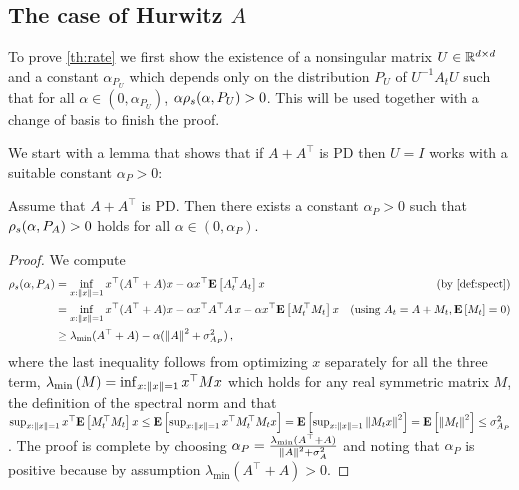 \subsection{The case of Hurwitz $A$}
To prove \cref{th:rate} we first show the existence of a nonsingular matrix $U\in \mathbb{R}^{d\times d}$ and a constant
$\alpha_{P_U}$ which depends only on the distribution $P_U$ of $U^{-1} A_t U$ such that for all $\alpha\in (0,\alpha_{P_U})$, $\alpha \rho_s(\alpha,P_U)>0$. This will be used together with a change of basis to finish the proof.

We start with a lemma that shows that if $A+A^\top$ is PD then $U=I$ works with a suitable constant $\alpha_P>0$:
\begin{lemma}\label{lm:pd}
Assume that $A+A^\top$ is PD. Then there exists a constant $\alpha_P>0$ such that  $\rho_s(\alpha,P_A)>0$ 
holds for all $\alpha \in (0,\alpha_P)$.
\end{lemma}
\begin{proof}
We compute
\begin{align*}
\rhos{P_A}&=\inf_{x:\norm{x}=1}x^\top (A^\top+A)x -\alpha x^\top\EE{A_t^\top A_t} x
	& (\text{by \cref{def:spect}}) \\
&=\inf_{x:\norm{x}=1}x^\top (A^\top+A)x -\alpha x^\top A^\top A\, x -\alpha x^\top \EE{M_t^\top M_t} x
	& (\text{using }A_t = A+M_t, \EE{M_t}=0) \\
&\geq \lambda_{\min}(A^\top+A)-\alpha( \norm{A}^2+ \sigma^2_{A_P})\,,
\end{align*}
where the last inequality follows from optimizing $x$ separately for all the three term,
$\lambda_{\min}\left(M\right) = \inf_{x:\left\| x\right\|=1} x^\top M x$ which holds for any real symmetric matrix $M$,
the definition of the spectral norm and 
 that $\sup_{x:\left\| x\right\|=1} x^\top \mathbf{E}\left[M_t^\top M_t\right] x
\le \mathbf{E}\left[ \sup_{x:\left\| x\right\|=1} x^\top M_t^\top M_t x\right] = \mathbf{E}\left[\sup_{x:\left\| x\right\|=1} \left\| M_t x\right\|^2 \right]
=\mathbf{E}\left[ \left\| M_t\right\|^2 \right] \le \sigma^2_{A_P}$.
The proof is complete by choosing $\alpha_P=\frac{\lambda_{\min}(A^\top+A)}{\left\| A\right\|^2+\sigma^2_A}$
and noting that $\alpha_P$ is positive because by assumption $\lambda_{\min}(A^\top+A)>0$.
\end{proof}

